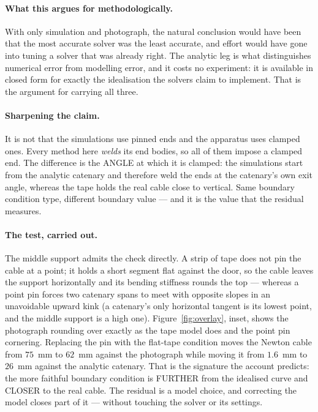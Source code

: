 \documentclass[11pt,a4paper]{article}
\begin{document}
\paragraph{What this argues for methodologically.} With only simulation and
photograph, the natural conclusion would have been that the most accurate
solver was the least accurate, and effort would have gone into tuning a solver
that was already right. The analytic leg is what distinguishes numerical error
from modelling error, and it costs no experiment: it is available in closed
form for exactly the idealisation the solvers claim to implement. That is the
argument for carrying all three.

\paragraph{Sharpening the claim.} It is not that the simulations use pinned
ends and the apparatus uses clamped ones. Every method here \emph{welds} its
end bodies, so all of them impose a clamped end. The difference is the ANGLE at
which it is clamped: the simulations start from the analytic catenary and
therefore weld the ends at the catenary's own exit angle, whereas the tape
holds the real cable close to vertical. Same boundary condition type, different
boundary value --- and it is the value that the residual measures.

\paragraph{The test, carried out.} The middle support admits the check directly. A strip of tape does not pin the cable at a point; it holds a short segment flat against the door, so the cable leaves the support horizontally and its bending stiffness rounds the top --- whereas a point pin forces two catenary spans to meet with opposite slopes in an unavoidable upward kink (a catenary's only horizontal tangent is its lowest point, and the middle support is a high one). Figure~\ref{fig:overlay}, inset, shows the photograph rounding over exactly as the tape model does and the point pin cornering. Replacing the pin with the flat-tape condition moves the Newton cable from $75$~mm to $62$~mm against the photograph while moving it from $1.6$~mm to $26$~mm against the analytic catenary. That is the signature the account predicts: the more faithful boundary condition is FURTHER from the idealised curve and CLOSER to the real cable. The residual is a model choice, and correcting the model closes part of it --- without touching the solver or its settings.
\end{document}
